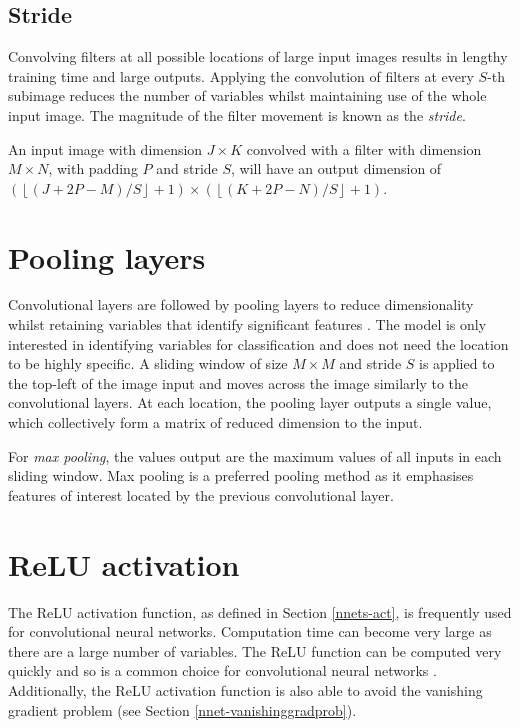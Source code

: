 \subsection*{Stride}\label{convnets-stride}

Convolving filters at all possible locations of large input images results in lengthy training time and large outputs. Applying the convolution of filters at every $S$-th subimage reduces the number of variables whilst maintaining use of the whole input image. The magnitude of the filter movement is known as the \textit{stride}.

An input image with dimension $J \times K$ convolved with a filter with dimension $M \times N$, with padding $P$ and stride $S$, will have an output dimension of $\left(\left\lfloor (J + 2P - M)/S\right\rfloor + 1\right) \times \left(\left\lfloor (K + 2P - N)/S \right\rfloor + 1\right)$.

\section{Pooling layers}\label{convnets-pool}

Convolutional layers are followed by pooling layers to reduce dimensionality whilst retaining variables that identify significant features \citep{ADeshpande2016}. The model is only interested in identifying variables for classification and does not need the location to be highly specific. A sliding window of size $M\times M$ and stride $S$ is applied to the top-left of the image input and moves across the image similarly to the convolutional layers. At each location, the pooling layer outputs a single value, which collectively form a matrix of reduced dimension to the input.

For \textit{max pooling}, the values output are the maximum values of all inputs in each sliding window. Max pooling is a preferred pooling method as it emphasises features of interest located by the previous convolutional layer.

\section{ReLU activation}\label{convnets-act}

The ReLU activation function, as defined in Section \ref{nnets-act}, is frequently used for  convolutional neural networks. Computation time can become very large as there are a large number of variables. The ReLU function can be computed very quickly and so is a common choice for convolutional neural networks \citep{ADeshpande2016}. Additionally, the ReLU activation function is also able to avoid the vanishing gradient problem (see Section \ref{nnet-vanishinggradprob}).


